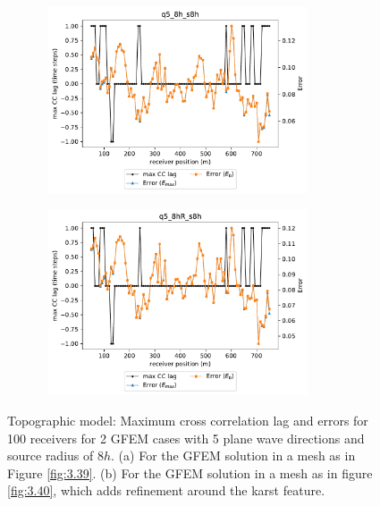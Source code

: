  \begin{figure}[h!]
 		\centering
		\begin{subfigure}{8cm}
				\includegraphics[width=8cm, height=5.5cm]{Thesis_Edith/figures/topo/topo_waves/Err_q5_8h_s8h.pdf}
			     \caption{}
		\end{subfigure}
        \hspace{0.25cm}	
		\begin{subfigure}{8cm}
				\includegraphics[width=8cm, height=5.5cm]{Thesis_Edith/figures/topo/topo_waves/Err_q5_8hR_s8h.pdf}
			   \caption{}
		\end{subfigure}
 
	\caption{Topographic model: Maximum cross correlation lag and errors for 100 receivers for 2 GFEM cases with 5 plane wave directions and source radius of $8h$. (a) For the GFEM solution in a mesh as in Figure \ref{fig:3.39}. (b) For the GFEM solution in a mesh as in figure \ref{fig:3.40}, which adds refinement around the karst feature.}
	\label{fig:3.46}
\end{figure}

